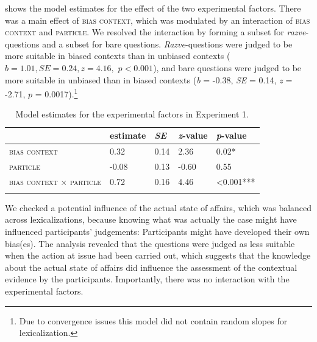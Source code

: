 \documentclass[output=paper,colorlinks,citecolor=brown]{langscibook}
\begin{document}
 shows the model estimates for the effect of the two experimental factors. There was a main effect of \textsc{bias context}, which was modulated by an interaction of \textsc{bias context} and \textsc{particle}. We resolved the interaction by forming a subset for \textit{razve}-questions and a subset for bare questions. \textit{Razve}-questions were judged to be more suitable in biased contexts than in unbiased contexts ($\textit{b} = 1.01, \textit{SE} = 0.24, \textit{z} = 4.16,$ $p < 0.001$), and bare questions were judged to be more suitable in unbiased than in biased contexts (\textit{b} = -0.38, \textit{SE} = 0.14, \textit{z} = -2.71, $p$ = 0.0017).\footnote[7]{Due to convergence issues this model did not contain random slopes for lexicalization.}

\begin{table}
\begin{tabularx}{\textwidth}{lYYYl}
\lsptoprule
& estimate & \textit{SE} & \textit{z}-value & \textit{p}-value \\
\midrule
\textsc{bias context} & \phantom{-}0.32 & 0.14 & \phantom{-}2.36 & \phantom{<}0.02* \\
\textsc{particle} & -0.08 & 0.13 & -0.60 & \phantom{<}0.55 \\
\textsc{bias context} $\times$ \textsc{particle} & \phantom{-}0.72 & 0.16 & \phantom{-}4.46 & <0.001*** \\
\lspbottomrule
\end{tabularx}
\caption{Model estimates for the experimental factors in Experiment 1.} \label{tab:05:6}
\end{table}

We checked a potential influence of the actual state of affairs, which was balanced across lexicalizations, because knowing what was actually the case might have influenced participants' judgements: Participants might have developed their own bias(es). The analysis revealed that the questions were judged as less suitable when the action at issue had been carried out, which suggests that the knowledge about the actual state of affairs did influence the assessment of the contextual evidence by the participants. Importantly, there was no interaction with the experimental factors. 
\end{document}
